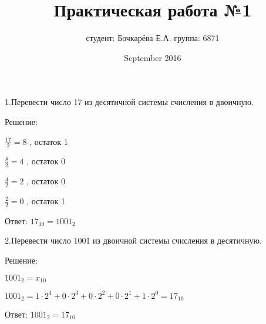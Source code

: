 \documentclass[a4paper,11pt]{article}
\title{Практическая работа №1}
\author{студент: Бочкарёва Е.А. группа: 6871 }
\date{September 2016}
\begin{document}
\maketitle
1.Перевести число 17 из десятичной системы счисления в двоичную.

Решение:

$\frac{17}{2}=8$ , остаток 1

$\frac{8}{2}=4$ , остаток 0

$\frac{4}{2}=2$ , остаток 0

$\frac{2}{2}=0$ , остаток 1

Ответ: $17_{10}=1001_2$

2.Перевести число 1001 из двоичной системы счисления в десятичную.

Решение:

$1001_2=x_{10}$

$1001_2=1\cdot2^4+0\cdot2^3+0\cdot2^2+0\cdot2^1+1\cdot2^0=17_{10}$

Ответ: $1001_2=17_{10}$
\end{document}

